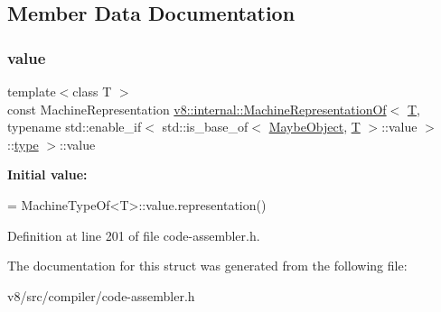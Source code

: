 \subsection{Member Data Documentation}
\mbox{\label{structv8_1_1internal_1_1MachineRepresentationOf_3_01T_00_01typename_01std_1_1enable__if_3_01std_22be0fa71299515dd80c0ce22cd21e64_a2ce579896775344121b33b652c90758d}} 
\subsubsection{\texorpdfstring{value}{value}}
{\footnotesize\ttfamily template$<$class T $>$ \\
const Machine\+Representation \mbox{\hyperlink{structv8_1_1internal_1_1MachineRepresentationOf}{v8\+::internal\+::\+Machine\+Representation\+Of}}$<$ \mbox{\hyperlink{classv8_1_1internal_1_1torque_1_1T}{T}}, typename std\+::enable\+\_\+if$<$ std\+::is\+\_\+base\+\_\+of$<$ \mbox{\hyperlink{classv8_1_1internal_1_1MaybeObject}{Maybe\+Object}}, \mbox{\hyperlink{classv8_1_1internal_1_1torque_1_1T}{T}} $>$\+::value $>$\+::\mbox{\hyperlink{classstd_1_1conditional_1_1type}{type}} $>$\+::value\hspace{0.3cm}{\ttfamily [static]}}

{\bfseries Initial value\+:}
\begin{DoxyCode}
=
      MachineTypeOf<T>::value.representation()
\end{DoxyCode}


Definition at line 201 of file code-\/assembler.\+h.



The documentation for this struct was generated from the following file\+:\begin{DoxyCompactItemize}
\item 
v8/src/compiler/code-\/assembler.\+h\end{DoxyCompactItemize}
